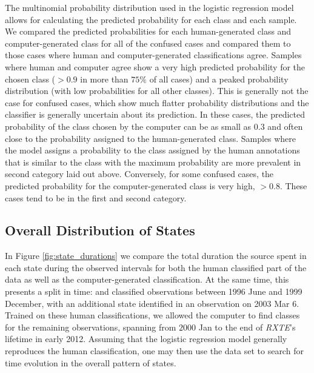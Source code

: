 \documentclass[fleqn,usenatbib]{mnras}
\newcommand{\project}[1]{\textsl{#1}}
\newcommand{\rxte}{\project{RXTE}}
\begin{document}
The multinomial probability distribution used in the logistic regression model allows for calculating the predicted probability for each class and each sample. We compared the predicted probabilities for each human-generated class and computer-generated class for all of the confused cases and compared them to those cases where human and computer-generated classifications agree. Samples where human and computer agree show a very high predicted probability for the chosen class ($>0.9$ in more than $75\%$ of all cases) and a peaked probability distribution (with low probabilities for all other classes). This is generally not the case for confused cases, which show much flatter probability distributions and the classifier is generally uncertain about its prediction. In these cases, the predicted probability of the class chosen by the computer can be as small as $0.3$ and often close to the probability assigned to the human-generated class. Samples where the model assigns a probability to the class assigned by the human annotations that is similar to the class with the maximum probability are more prevalent in second category laid out above. Conversely, for some confused cases, the predicted probability for the computer-generated class is very high, $>0.8$. These cases tend to be in the first and second category. 
\subsection{Overall Distribution of States}

In Figure \ref{fig:state_durations} we compare the total duration the source spent in each state during the observed intervals for both the human classified part of the data as well as the computer-generated classification. At the same time, this presents a split in time: \citet{belloni2000} and \citet{kleinwolt2002} classified observations between 1996 June and 1999 December, with an additional state identified in an observation on 2003 Mar 6. Trained on these human classifications,
we allowed the computer to find classes for the remaining observations, spanning from $2000$ Jan to the end of \rxte's lifetime in early 2012. 
Assuming that the logistic regression model generally reproduces the human classification, one may then use the data set to search for time evolution in the overall pattern of states. 
\end{document}
